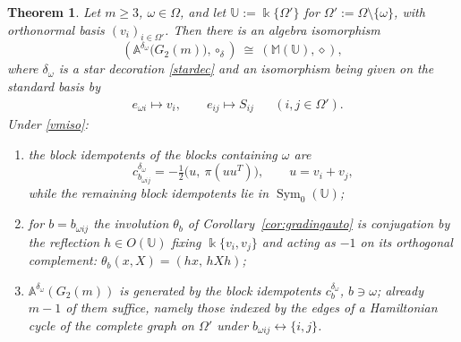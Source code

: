 \documentclass[times,11pt,reqno]{amsproc}
\newtheorem{theorem}{Theorem}[section]
\theoremstyle{definition}
\numberwithin{equation}{section}
\newcommand\fie{\Bbbk}
\def\alg{\mathbb{A}}
\def\ualg{\mathbb{U}}
\DeclareMathOperator{\Sym}{Sym}
\def\ualg{\mathbb{U}}
\def\malg{\mathbb{M}}
\newcommand{\vm}[1]{\malg(#1)}
\newcommand{\refl}{h}
\begin{document}
\begin{theorem}\label{thm:vm}
Let $m\ge3$, $\omega\in\Omega$, and let $\ualg:=\fie\{\Omega'\}$ for
$\Omega':=\Omega\setminus\{\omega\}$, with orthonormal basis
$(v_i)_{i\in\Omega'}$. Then there is an algebra isomorphism
\begin{equation}\label{vmiso}
(\alg^{\delta_\omega}\bigl(G_2(m)\bigr), \circ_\delta)\ \cong\ (\vm{\ualg}, \diamond),
\end{equation}
where $\delta_\omega$ is a star decoration \eqref{stardec} and an isomorphism being given on the standard basis by
\begin{align}
&e_{\omega i}\longmapsto v_i,
\qquad
e_{ij}\longmapsto S_{ij}
&&
(i,j\in\Omega').
\end{align}
Under \eqref{vmiso}:
\begin{enumerate}
\item[(a)] the block idempotents of the blocks containing $\omega$ are
\begin{equation}\label{vmaxis}
c_{b_{\omega ij}}^{\delta_\omega}
=
-\tfrac12\bigl(u,\ \pi(uu^{T})\bigr),
\qquad
u=v_i+v_j ,
\end{equation}
while the remaining block idempotents lie in $\Sym_0(\ualg)$;
\item[(b)] for $b=b_{\omega ij}$ the involution $\theta_b$ of
Corollary~\ref{cor:gradingauto} is conjugation by the reflection
${\refl}\in O(\ualg)$ fixing $\fie\{v_i,v_j\}$ and acting as $-1$ on its
orthogonal complement:
$\theta_b(x,X)=({\refl}x,\,{\refl}X{\refl})$;
\item[(c)] $\alg^{\delta_\omega}(G_2(m))$ is generated by the block
idempotents $c^{\delta_\omega}_{b}$, $b\ni\omega$; already $m-1$ of them
suffice, namely those indexed by the edges of a Hamiltonian cycle of the
complete graph on $\Omega'$ under $b_{\omega ij}\leftrightarrow\{i,j\}$.
\end{enumerate}
\end{theorem}
\end{document}

